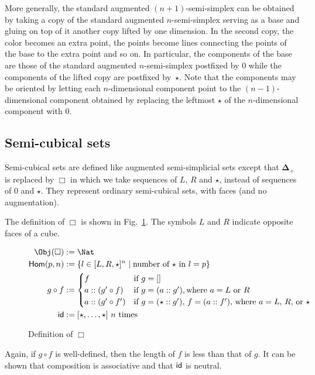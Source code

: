 \documentclass{msc}
\newcommand{\DeltaPlus}{\ensuremath{\boldsymbol{\Delta}_+}}
\newcommand{\Cube}{\ensuremath{\boldsymbol{{\Box}}}}
\newcommand{\kstar}{{\star}}
\begin{document}
More generally, the standard augmented $(n + 1)$-semi-simplex can be obtained by taking a copy of the standard augmented $n$-semi-simplex serving as a base and gluing on top of it another copy lifted by one dimension. In the second copy, the color becomes an extra point, the points become lines connecting the points of the base to the extra point and so on. In particular, the components of the base are those of the standard augmented $n$-semi-simplex postfixed by $0$ while the components of the lifted copy are postfixed by~$\kstar$. Note that the components may be oriented by letting each $n$-dimensional component point to the $(n-1)$-dimensional component obtained by replacing the leftmost $\kstar$ of the $n$-dimensional component with $0$.

\subsection{Semi-cubical sets}
Semi-cubical sets are defined like augmented semi-simplicial sets except that $\DeltaPlus$ is replaced by $\Cube$ in which we take sequences of $L$, $R$ and $\star$, instead of sequences of $0$ and $\kstar$. They represent ordinary semi-cubical sets, with faces (and no augmentation).

\begin{definition}[\Cube]
  The definition of $\Cube$ is shown in Fig.~\ref{fig:cube}. The symbols $L$ and $R$ indicate opposite faces of a cube.
  \begin{figure}[H]
    \begin{align*}
      \Obj(\Cube) & := \Nat                                                                                \\
      \Hom(p, n)  & := \{l \in [L, R, \kstar]^n \mid \text{number of $\kstar$ in $l = p$}\}                \\
      g \circ f   & :=
      \begin{cases}
        f                  & \text{if $g = []$}                                                              \\
        a :: (g' \circ f)  & \text{if $g = (a :: g')$}, \text{where $a = L$ or $R$}                          \\
        a :: (g' \circ f') & \text{if $g = (\star :: g')$, $f = (a :: f')$, where $a = L$, $R$, or $\kstar$} \\
      \end{cases} \\
      \id         & := [\kstar, \ldots, \kstar] \text{ $n$ times}
    \end{align*}
    \caption{Definition of \Cube}\label{fig:cube}
  \end{figure}

  Again, if $g \circ f$ is well-defined, then the length of $f$ is less than that of $g$. It can be shown that composition is associative and that $\mathsf{id}$ is neutral.
\end{definition}
\end{document}
